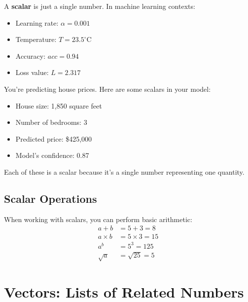 \documentclass{article}
\newcounter{example}
\begin{document}
A \textbf{scalar} is just a single number. In machine learning contexts:
\begin{itemize}
    \item Learning rate: $\alpha = 0.001$
    \item Temperature: $T = 23.5^\circ\text{C}$
    \item Accuracy: $acc = 0.94$
    \item Loss value: $L = 2.317$
\end{itemize}

\begin{tcolorbox}[colback=green!5!white,colframe=green!75!black,title=Example \stepcounter{example}\#\theexample: House Price Prediction]
You're predicting house prices. Here are some scalars in your model:
\begin{itemize}
    \item House size: 1,850 square feet
    \item Number of bedrooms: 3
    \item Predicted price: \$425,000
    \item Model's confidence: 0.87
\end{itemize}
Each of these is a scalar because it's a single number representing one quantity.
\end{tcolorbox}

\subsection{Scalar Operations}

When working with scalars, you can perform basic arithmetic:
\begin{align}
a + b &= 5 + 3 = 8 \\
a \times b &= 5 \times 3 = 15 \\
a^b &= 5^3 = 125 \\
\sqrt{a} &= \sqrt{25} = 5
\end{align}

\begin{center}
\end{center}

\section{Vectors: Lists of Related Numbers}
\end{document}
